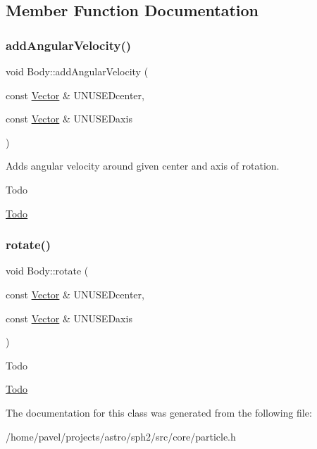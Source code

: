 \subsection{Member Function Documentation}
\hypertarget{classBody_aefc7d09616d51ba1652a4a6940b06c5e}{}\label{classBody_aefc7d09616d51ba1652a4a6940b06c5e} 
\subsubsection{\texorpdfstring{add\+Angular\+Velocity()}{addAngularVelocity()}}
{\footnotesize\ttfamily void Body\+::add\+Angular\+Velocity (\begin{DoxyParamCaption}\item[{const \hyperlink{classBasicVector}{Vector} \&}]{U\+N\+U\+S\+EDcenter,  }\item[{const \hyperlink{classBasicVector}{Vector} \&}]{U\+N\+U\+S\+EDaxis }\end{DoxyParamCaption})\hspace{0.3cm}{\ttfamily [inline]}}



Adds angular velocity around given center and axis of rotation. 

\begin{DoxyRefDesc}{Todo}
\item[\hyperlink{todo__todo000006}{Todo}]\end{DoxyRefDesc}
\hypertarget{classBody_ad506a868ff9e989282cb948d44f35f42}{}\label{classBody_ad506a868ff9e989282cb948d44f35f42} 
\subsubsection{\texorpdfstring{rotate()}{rotate()}}
{\footnotesize\ttfamily void Body\+::rotate (\begin{DoxyParamCaption}\item[{const \hyperlink{classBasicVector}{Vector} \&}]{U\+N\+U\+S\+EDcenter,  }\item[{const \hyperlink{classBasicVector}{Vector} \&}]{U\+N\+U\+S\+EDaxis }\end{DoxyParamCaption})\hspace{0.3cm}{\ttfamily [inline]}}

\begin{DoxyRefDesc}{Todo}
\item[\hyperlink{todo__todo000005}{Todo}]\end{DoxyRefDesc}


The documentation for this class was generated from the following file\+:\begin{DoxyCompactItemize}
\item 
/home/pavel/projects/astro/sph2/src/core/particle.\+h\end{DoxyCompactItemize}
